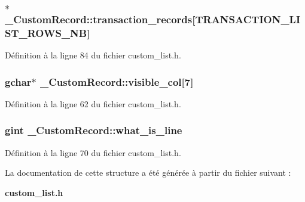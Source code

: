 \subsubsection[{transaction\_\-records}]{$\ast$ {\bf \_\-CustomRecord::transaction\_\-records}[TRANSACTION\_\-LIST\_\-ROWS\_\-NB]}\label{struct__CustomRecord_a40d1d60d6e8dc159a54d6b0b46411b3e}


Définition à la ligne 84 du fichier custom\_\-list.h.

\subsubsection[{visible\_\-col}]{\setlength{\rightskip}{0pt plus 5cm}gchar$\ast$ {\bf \_\-CustomRecord::visible\_\-col}[7]}\label{struct__CustomRecord_a0d64de6657df72561164b3317bbdc2f4}


Définition à la ligne 62 du fichier custom\_\-list.h.

\subsubsection[{what\_\-is\_\-line}]{\setlength{\rightskip}{0pt plus 5cm}gint {\bf \_\-CustomRecord::what\_\-is\_\-line}}\label{struct__CustomRecord_ada475877058ff4ab0c8602d6464168e7}


Définition à la ligne 70 du fichier custom\_\-list.h.



La documentation de cette structure a été générée à partir du fichier suivant :\begin{DoxyCompactItemize}
\item 
{\bf custom\_\-list.h}\end{DoxyCompactItemize}
